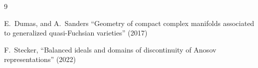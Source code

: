 \begin{thebibliography}{9}

E.~Dumas, and A.~Sanders ``Geometry of compact complex manifolds associated to generalized quasi-Fuchsian varieties''
(2017)

F.~Stecker, ``Balanced ideals and domains of discontinuity of Anosov representations''
(2022)

    
    
    
\end{thebibliography}
